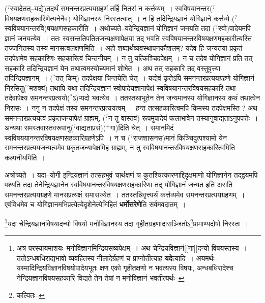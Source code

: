 \documentclass[article,12pt,a4paper]{memoir}
\newcommand{\unclear}[1]{($^{?}$#1)}
\newcommand{\add}[1]{($^{+}$#1)}
\begin{document}
	  \pstart \unclear{स्यादेतत्--यद्ये}तदर्थं समनन्तरप्रत्ययग्रहणं तर्हि नितरां न कर्त्तव्यम् । स्वविषयानन्तर\unclear{विषयक्षणसहकारिणेत्यनेनैव} योगिज्ञानस्य निरस्तत्वात् । न हि तदिन्द्रियज्ञानं योगिज्ञाने कर्त्तव्ये \unclear{स्वविषयानन्तरवि}षयक्षणसहकारीति । अथोच्यते--यदेन्द्रियज्ञानं योगिज्ञानं जनयति तदा \unclear{स्वो}पादेयमपि ज्ञानं जनयत्येव । ततः स्वसन्ततिपतितजन्यक्षणापेक्षया तद् भवति स्वविषयानन्तरविषयक्षणमहकारीत्यस्ति तज्जनितस्य तस्य मानसत्वलक्षणमिति । अहो शब्दार्थव्यवस्थापनकौशलम्? यदेव हि जन्यतया प्रकृतं तदपेक्षमेव सहकारिणः सहकारित्वं चिन्तनीयम् । न तु यत्किञ्चिदपेक्षम् । न च तदेव योगिज्ञानं प्रति तत् सहकारि तदिन्द्रियज्ञानं येन तथात्वमस्योच्यमानं शोभेत । अथ तत् सहकारि तद् वस्तुवृत्त्या तदिन्द्रियज्ञानम् । \unclear{तत् किम्} तदपेक्षया चिन्तयेति चेत् । यद्येवं कृतेऽपि समनन्तरप्रत्ययग्रहणे योगिज्ञानं निरसितु\unclear{मशक्यं} तथापि यथा तदिन्द्रियज्ञानं स्वोपादेयज्ञानापेक्षं स्वविषयानन्तरविषयसहकारि तथा तदेवापेक्ष्य समनन्तरप्रत्ययो\unclear{ऽ}प्यदो भ\leavevmode{}वत्येव । ततस्तथाभूतेन तेन जन्यमानस्य योगिज्ञानस्य कथं तथात्वेन निरासः । ननु न तदपेक्षं तस्य समनन्तरप्रत्ययत्वम् । हन्त तत्सहकारित्वमपि किमस्य तदपेक्षमस्ति ? अथ समनन्तरप्रत्ययत्वं प्रकृतजन्यापेक्षं ग्राह्यम्, \unclear{न तु वास्तवं} रूपमुपादेयं फलाभावेन तस्यानुवाद्यताऽनुपपत्तेः । अन्यथा समस्तवास्तवरूपानु\unclear{वाद्यताप्रसं}\add{गा}दिति चेत् । समानमिदं स्वविषययानन्तरविषयक्षणसहकारिग्रहणेऽपि । न च \unclear{राजशासनस}मानं किञ्चिदुत्पश्यामो येन समनन्तरप्रत्ययजन्यत्वमेव प्रकृतजन्यापेक्षमिह ग्राह्यम्, न तु स्वविषयानन्तरविषयक्षणसहकारित्वमिति कल्पनीयमिति ।
	\pend
      

	  \pstart अत्रोच्यते । यदा--योगी इन्द्रियज्ञानं तत्सहभुवं चार्थक्षणं च कुतश्चित्कारणाद्दिदृक्षमाणो योगिज्ञानेन तद्द्वयमपि पश्यति तदा तेनेन्द्रियज्ञानेन स्वविषयानन्तरविषयक्षणसहकारिणा तद् योगिज्ञानं जन्यत इति असति समनन्तरप्रत्ययग्रहणे मानसप्रत्यक्षं समासज्येत । ततस्तन्निवृत्त्यर्थं कर्त्तव्यमेव समनन्तरप्रत्ययग्रहणम् । एवंविधमेव च योगिज्ञानमभिप्रत्येत्येदृशेनेत्येभिहितं \textbf{धर्मोत्तरेणे}ति सर्वमवदातम् ।
	\pend
      \leavevmode{}
	  \bigskip
	  \begingroup
	

	  \pstart \footnote{अत्र परस्यायमाशयः--मनोविज्ञानमिन्द्रियसव्यपेक्षम् । अथ चेन्द्रियविज्ञानं[[ना]]दन्यो विषयस्तस्य । ततोऽन्धबधिराद्यभावो व्यवहितस्य नीलादेर्ग्रहणं च प्राप्नोतीत्याह \textbf{यदे}त्यादि । अयमर्थः--यस्मादिन्द्रियविज्ञानविषयोपादेयभूतः क्षण एको गृहीतक्षणो न भवत्यस्य विषयः, अन्धबधिरादेश्च नेन्द्रियज्ञानविषयसहकारि विद्यते तेन तेषां न मनोविज्ञानं भवतीत्यर्थः--\cite{dp-msD-n}}यदा चेन्द्रियज्ञानविषयादन्यो विषयो मनोविज्ञानस्य तदा गृहीतग्रहणादासञ्जितोऽ\footnote{कल्पितः--\cite{dp-msD-n}}प्रामाण्यदोषो निरस्तः ।
	\pend
       
\end{document}
